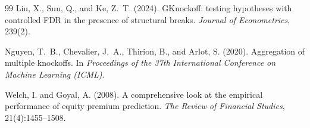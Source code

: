 \documentclass[12pt, a4paper]{article}
\begin{document}
\begin{thebibliography}{99}
Liu, X., Sun, Q., and Ke, Z.~T. (2024).
\newblock GKnockoff: testing hypotheses with controlled FDR in the presence of structural breaks.
\newblock \emph{Journal of Econometrics}, 239(2).

Nguyen, T.~B., Chevalier, J.~A., Thirion, B., and Arlot, S. (2020).
\newblock Aggregation of multiple knockoffs.
\newblock In \emph{Proceedings of the 37th International Conference on Machine Learning (ICML)}.

Welch, I. and Goyal, A. (2008).
\newblock A comprehensive look at the empirical performance of equity premium prediction.
\newblock \emph{The Review of Financial Studies}, 21(4):1455--1508.

\end{thebibliography}
\endgroup
\end{document}
